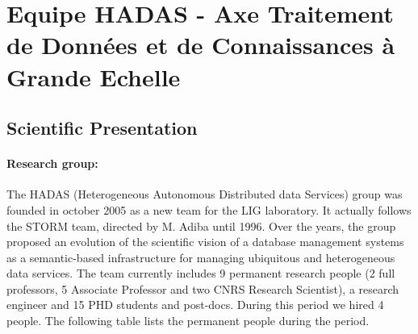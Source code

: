 

\section{Equipe HADAS - Axe Traitement de Donn{\'e}es et de Connaissances {\`a} Grande Echelle} 
\label{sec:hadas}

\subsection{Scientific Presentation} %
\label{sub:hadas_scientific_presentation}

\paragraph{Research group:}

The HADAS (Heterogeneous  Autonomous Distributed data Services) group was founded in october 2005 as a new team for the LIG laboratory. It actually follows the STORM team, directed by M. Adiba until 1996. 
Over the years, the group  proposed an evolution of the scientific vision of a database management systems  as  a semantic-based infrastructure for managing ubiquitous and heterogeneous data services. 
The team currently includes 9  permanent research people (2 full professors, 5 Associate Professor and two CNRS Research Scientist),  a research engineer and 15 PHD students and post-docs. During this period we hired 4 people. The following table lists the permanent people during the period. 


